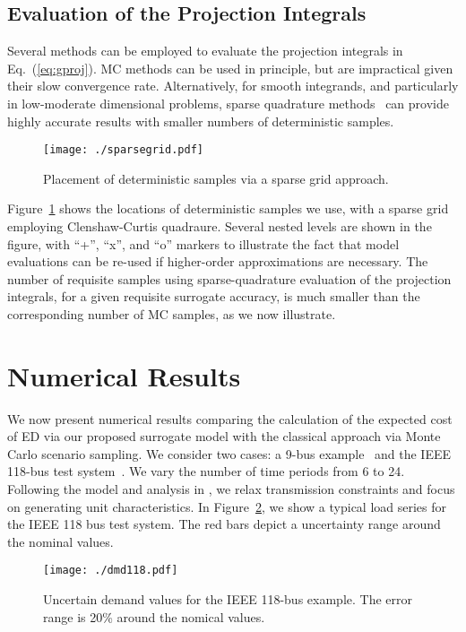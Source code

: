 \documentclass[conference]{IEEEtran}
\begin{document}
\subsection{Evaluation of the Projection Integrals}

Several methods can be employed to evaluate the projection integrals in
Eq.~(\ref{eq:gproj}). MC methods can be used in principle, but are impractical
given their slow convergence rate. Alternatively, for smooth
integrands, and particularly in low-moderate dimensional problems, sparse
quadrature methods~\cite{Smolyak:1963,Gerstner:1998,Conrad:2013} can provide
highly accurate results with smaller numbers of deterministic samples.
\begin{figure}[t]
\centering
\texttt{[image: ./sparsegrid.pdf]}
\caption{\label{fig:sgr} Placement of deterministic samples via a
  sparse grid approach. }
\end{figure}
Figure~\ref{fig:sgr} shows the locations of deterministic samples we use, with a
sparse grid employing Clenshaw-Curtis quadraure. Several nested levels are shown
in the figure, with ``+'', ``x'', and ``o'' markers to illustrate the fact that
model evaluations can be re-used if higher-order approximations are necessary.
The number of requisite samples using sparse-quadrature evaluation of the
projection integrals, for a given requisite surrogate accuracy, is much smaller
than the corresponding number of MC samples, as we now illustrate.

\section{Numerical Results}
\label{sec:results}

We now present numerical results comparing the calculation of the 
expected cost of ED via our proposed surrogate model with the
classical approach via Monte Carlo scenario sampling. We consider
two cases: a 9-bus example~\cite{Chow:1982} and the IEEE 118-bus
test system~\cite{IEEEdata}. We vary the number of time periods 
from 6 to 24. Following the model and analysis in \cite{carrionarroyo06}, 
we relax transmission constraints and focus on generating unit characteristics.
In Figure~\ref{fig:dmd}, we show a typical load series for the IEEE 118 
bus test system. The red bars depict a  uncertainty range around 
the nominal values.

\begin{figure}[h]
\centering 
\texttt{[image: ./dmd118.pdf]} \\
\caption{\label{fig:dmd} Uncertain demand values for the IEEE 118-bus
  example. The error range is 20\% around the nomical values.}
\end{figure}
\end{document}
